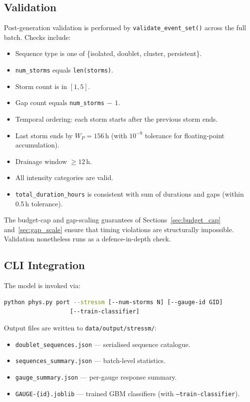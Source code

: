 \documentclass[11pt,a4paper]{article}
\begin{document}
\subsection{Validation}
\label{sec:validation}

Post-generation validation is performed by \texttt{validate\_event\_set()} across
the full batch. Checks include:

\begin{itemize}[nosep]
  \item Sequence type is one of \{isolated, doublet, cluster, persistent\}.
  \item \texttt{num\_storms} equals \texttt{len(storms)}.
  \item Storm count is in $[1, 5]$.
  \item Gap count equals \texttt{num\_storms}$\,-\,1$.
  \item Temporal ordering: each storm starts after the previous storm ends.
  \item Last storm ends by $W_P = 156\,\text{h}$ (with $10^{-9}$ tolerance for
        floating-point accumulation).
  \item Drainage window $\geq 12\,\text{h}$.
  \item All intensity categories are valid.
  \item \texttt{total\_duration\_hours} is consistent with sum of durations and gaps
        (within 0.5\,h tolerance).
\end{itemize}

\noindent The budget-cap and gap-scaling guarantees of Sections~\ref{sec:budget_cap}
and~\ref{sec:gap_scale} ensure that timing violations are structurally impossible.
Validation nonetheless runs as a defence-in-depth check.

\subsection{CLI Integration}

The model is invoked via:
\begin{lstlisting}[language=bash]
python phys.py port --stressm [--num-storms N] [--gauge-id GID]
                   [--train-classifier]
\end{lstlisting}

\noindent Output files are written to \texttt{data/output/stressm/}:
\begin{itemize}[nosep]
  \item \texttt{doublet\_sequences.json} --- serialised sequence catalogue.
  \item \texttt{sequences\_summary.json} --- batch-level statistics.
  \item \texttt{gauge\_summary.json} --- per-gauge response summary.
  \item \texttt{GAUGE-\{id\}.joblib} --- trained GBM classifiers (with \texttt{--train-classifier}).
\end{itemize}
\end{document}
